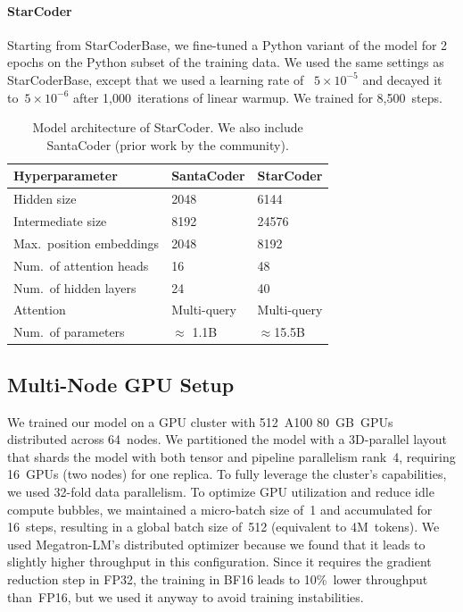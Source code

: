 \documentclass[10pt]{article} %
\begin{document}
\paragraph{StarCoder} Starting from StarCoderBase, we fine-tuned a Python variant of the model for 2 epochs on the Python subset of the training data.  We used the same settings as StarCoderBase, except that we used a learning rate of ~$5\times10^{-5}$ and decayed it to~$5\times10^{-6}$ after 1,000~iterations of linear warmup. We trained for 8,500~steps. 

\begin{table}[t]
\centering
\begin{tabular}{lll}
\toprule
\textbf{Hyperparameter} & \textbf{SantaCoder} &\textbf{StarCoder}\\
\midrule
Hidden size              & 2048 & 6144             \\
Intermediate size        & 8192 & 24576            \\
Max.\ position embeddings & 2048 & 8192            \\
Num.\ of attention heads  & 16 &  48              \\
Num.\ of hidden layers    & 24 &  40              \\ 
Attention & Multi-query &  Multi-query\\
\midrule
Num.\ of parameters      & $\approx$ 1.1B & $\approx$15.5B \\ 
\bottomrule
\end{tabular}
\caption{Model architecture of StarCoder. We also include SantaCoder (prior work by the community). }
\label{tab:decoder_arch}
\end{table}



\subsection{Multi-Node GPU Setup}\label{sec:multinode_training}

We trained our model on a GPU cluster with 512~A100 80~GB~GPUs distributed across 64~nodes. We partitioned the model with a 3D-parallel layout that shards the model with both tensor and pipeline parallelism rank~4, requiring 16~GPUs (two nodes) for one replica. To fully leverage the cluster's capabilities, we used 32-fold data parallelism. To optimize GPU utilization and reduce idle compute bubbles, we maintained a micro-batch size of~1 and accumulated for 16~steps, resulting in a global batch size of~512 (equivalent to 4M~tokens). We used Megatron-LM's distributed optimizer because we found that it leads to slightly higher throughput in this configuration. Since it requires the gradient reduction step in FP32, the training in BF16 leads to 10\%~lower throughput than~FP16, but we used it anyway to avoid training instabilities.  
\end{document}
